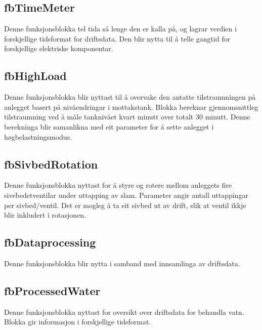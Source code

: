 \subsection{fbTimeMeter}
Denne funksjonsblokka tel tida så lenge den er kalla på, og lagrar verdien i forskjellige tidsformat for driftsdata.
Den blir nytta til å telle gangtid for forskjellige elektriske komponentar.

\newpage

\subsection{fbHighLoad}
Denne funksjonsblokka blir nyttast til å overvake den antatte tilstraumningen på anlegget basert på nivåendringar i mottakstank.
Blokka bereknar gjennomsnittleg tilstraumning ved å måle tanknivået kvart minutt over totalt 30 minutt.
Denne berekninga blir samanlikna med eit parameter for å sette anlegget i høgbelastningsmodus.

\subsection{fbSivbedRotation}
Denne funksjonsblokka nyttast for å styre og rotere mellom anleggets fire sivebedetventilar under uttapping av slam. 
Parameter angir antall uttappingar per sivbed/ventil.
Det er mogleg å ta eit sivbed ut av drift, slik at ventil ikkje blir inkludert i rotasjonen.

\subsection{fbDataprocessing}
Denne funksjonsblokka blir nytta i samband med innsamlinga av driftsdata. 

\subsection{fbProcessedWater}
Denne funksjonsblokka nyttast for oversikt over driftsdata for behandla vatn. 
Blokka gir informasjon i forskjellige tidsformat.

\newpage

